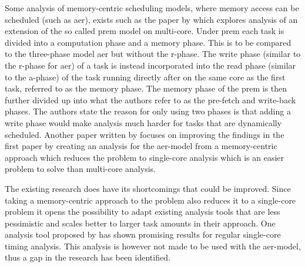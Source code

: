 \documentclass{kththesis}
\begin{document}

Some analysis of memory-centric scheduling models, where memory access can be scheduled (such as
\acrshort{aer}), exists such as the paper by \textcite{alhammad_schedulability_2014} which explores
analysis of an extension of the so called \acrfull{prem} model on multi-core. Under \acrshort{prem}
each task is divided into a computation phase and a memory phase. This is to be compared to the
three-phase model \acrshort{aer} but without the \acrshort{r}-phase. The write phase (similar to the
\acrshort{r}-phase for \acrshort{aer}) of a task is instead incorporated into the read phase
(similar to the \acrshort{a}-phase) of the task running directly after on the same core as the first
task, referred to as the memory phase. The memory phase of the \acrshort{prem} is then further
divided up into what the authors refer to as the pre-fetch and write-back phases. The authors state
the reason for only using two phases is that adding a write phase would make analysis much harder
for tasks that are dynamically scheduled. Another paper written by
\textcite{maia_schedulability_2017} focuses on improving the findings in the first paper by creating
an analysis for the \acrshort{aer}-model from a memory-centric approach which reduces the problem to
single-core analysis which is an easier problem to solve than multi-core analysis.


The existing research does have its shortcomings that could be improved. Since taking a
memory-centric approach to the problem also reduces it to a single-core problem it opens the
possibility to adapt existing analysis tools that are less pessimistic and scales better to larger
task amounts in their approach. One analysis tool proposed by \textcite{nasri_exact_2017} has shown
promising results for regular single-core timing analysis. This analysis is however not
made to be used with the \acrshort{aer}-model, thus a gap in the research has been identified.


\end{document}
